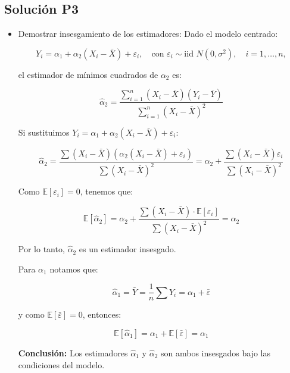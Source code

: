 \documentclass[12pt,a4paper]{article}
\begin{document}
\subsection*{Solución P3}
    \begin{itemize}
    
        \item [a)] Demostrar insesgamiento de los estimadores:
        Dado el modelo centrado:
        
        \[
        Y_i = \alpha_1 + \alpha_2(X_i - \bar{X}) + \varepsilon_i,
        \quad \text{con } \varepsilon_i \sim \text{iid } N(0, \sigma^2), \quad i = 1,\dots,n,
        \]
        
        el estimador de mínimos cuadrados de \( \alpha_2 \) es:
        
        \[
        \hat{\alpha}_2 = \frac{\sum_{i=1}^n (X_i - \bar{X})(Y_i - \bar{Y})}{\sum_{i=1}^n (X_i - \bar{X})^2}
        \]
        
        Si sustituimos \( Y_i = \alpha_1 + \alpha_2(X_i - \bar{X}) + \varepsilon_i \):
        
        \[
        \hat{\alpha}_2 = \frac{\sum (X_i - \bar{X})(\alpha_2(X_i - \bar{X}) + \varepsilon_i)}{\sum (X_i - \bar{X})^2}
        = \alpha_2 + \frac{\sum (X_i - \bar{X})\varepsilon_i}{\sum (X_i - \bar{X})^2}
        \]
        
        Como \( \mathbb{E}[\varepsilon_i] = 0 \), tenemos que:
        
        \[
        \mathbb{E}[\hat{\alpha}_2] = \alpha_2 + \frac{\sum (X_i - \bar{X}) \cdot \mathbb{E}[\varepsilon_i]}{\sum (X_i - \bar{X})^2} = \alpha_2
        \]
        
        Por lo tanto, \( \hat{\alpha}_2 \) es un estimador insesgado.
        
        \bigskip
        
        Para \( \alpha_1 \) notamos que:
        
        \[
        \hat{\alpha}_1 = \bar{Y} = \frac{1}{n} \sum Y_i = \alpha_1 + \bar{\varepsilon}
        \]
        
        y como \( \mathbb{E}[\bar{\varepsilon}] = 0 \), entonces:
        
        \[
        \mathbb{E}[\hat{\alpha}_1] = \alpha_1 + \mathbb{E}[\bar{\varepsilon}] = \alpha_1
        \]
        
        \textbf{Conclusión:} Los estimadores \( \hat{\alpha}_1 \) y \( \hat{\alpha}_2 \) son ambos insesgados bajo las condiciones del modelo.
        \bigskip
        

\end{itemize}
\end{document}

